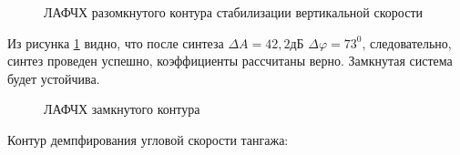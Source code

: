 \begin{figure}[H]
    \caption{ЛАФЧХ разомкнутого контура стабилизации вертикальной скорости}
    \label{fig:Вертикальная скорость раз qMIN}
\end{figure}

Из рисунка \ref{fig:Вертикальная скорость раз qMIN} видно, что после синтеза $\Delta A = 42,2 $дБ $\Delta \varphi = 73^0$, следовательно, синтез проведен успешно, коэффициенты рассчитаны верно. Замкнутая система будет устойчива. 

\begin{figure}[H]
    \caption{ЛАФЧХ замкнутого контура }
    \label{fig:Вертикальная скорость зам qMIN}
\end{figure}

\begin{center}
    Контур демпфирования угловой скорости тангажа:
\end{center}

